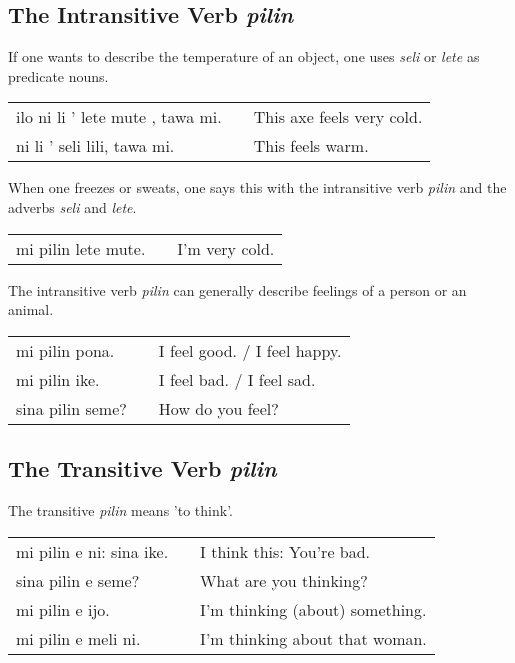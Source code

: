 %
\subsection*{The Intransitive Verb \textit{pilin}}
%

If one wants to describe the temperature of an object, one uses \textit{seli} or \textit{lete} as predicate nouns.

\begin{supertabular}{p{5,5cm}|ll}
    ilo ni li ' lete mute , tawa mi. &  & This axe feels very cold. \\
    ni li ' seli lili, tawa mi.      &  & This feels warm.          \\
\end{supertabular}

When one freezes or sweats, one says this with the intransitive verb \textit{pilin} and the adverbs \textit{seli} and \textit{lete}.

\begin{supertabular}{p{5,5cm}|ll}
    mi pilin lete mute. &  & I'm very cold. \\
\end{supertabular}

The intransitive verb \textit{pilin} can generally describe feelings of a person or an animal.

\begin{supertabular}{p{5,5cm}|ll}
    mi pilin pona.   &  & I feel good. / I feel happy. \\
    mi pilin ike.    &  & I feel bad. / I feel sad.    \\
    sina pilin seme? &  & How do you feel?             \\
\end{supertabular}

%
\subsection*{The Transitive Verb \textit{pilin}}
%

The transitive \textit{pilin} means 'to think'.

\begin{supertabular}{p{5,5cm}|ll}
    mi pilin e ni: sina ike. &  & I think this: You're bad.       \\
    sina pilin e seme?       &  & What are you thinking?          \\
    mi pilin e ijo.          &  & I'm thinking (about) something. \\
    mi pilin e meli ni.      &  & I'm thinking about that woman.  \\
\end{supertabular}
%
%
%
\newpage
%
